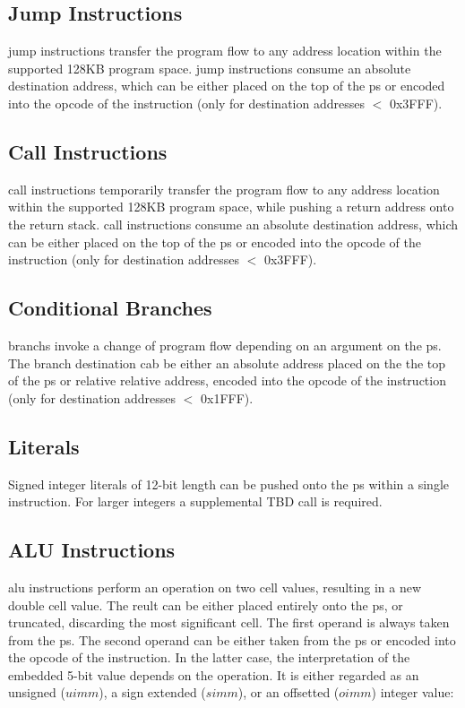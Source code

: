 \subsection{Jump Instructions}
\label{opcodes:jump}

\Gls{jump} instructions transfer the program flow to any address
location within the supported 128KB program space. \Gls{jump} instructions consume an absolute
destination address, which can be either placed on the top of the \Gls{ps} or encoded
into the opcode of the instruction (only for destination addresses $<$ 0x3FFF).

\subsection{Call Instructions}
\label{opcodes:call}

\Gls{call} instructions temporarily transfer the program flow to any address
location within the supported 128KB program space, while pushing a return address onto
the return stack. \Gls{call} instructions consume an absolute
destination address, which can be either placed on the top of the \Gls{ps} or encoded
into the opcode of the instruction (only for destination addresses $<$ 0x3FFF).

\subsection{Conditional Branches}
\label{opcodes:branch}

\Glspl{branch} invoke a change of program flow depending on an argument on the
\gls{ps}. The branch destination cab be either an absolute address placed on the the top of  
the \Gls{ps} or relative relative address, encoded into the opcode of the instruction
(only for destination addresses $<$ 0x1FFF).

\subsection{Literals}
\label{opcodes:literal}

Signed integer \glspl{literal} of 12-bit length can be pushed onto the \gls{ps} within
a single instruction. For larger integers a supplemental TBD \gls{call} is required.

\subsection{ALU Instructions}
\label{opcodes:alu}
\Gls{alu} instructions perform an operation on two \gls{cell} values, resulting in a new double 
\gls{cell} value. The reult can be either placed entirely onto the \gls{ps}, or truncated, discarding
the most significant \gls{cell}. The first operand is always taken from the \Gls{ps}. The second operand can be
either taken from the \Gls{ps} or encoded into the opcode of the instruction. In the latter case,
the interpretation of the embedded 5-bit value depends on the operation. It is either regarded as an unsigned
($uimm$), a sign extended ($simm$), or an offsetted ($oimm$) integer value:


